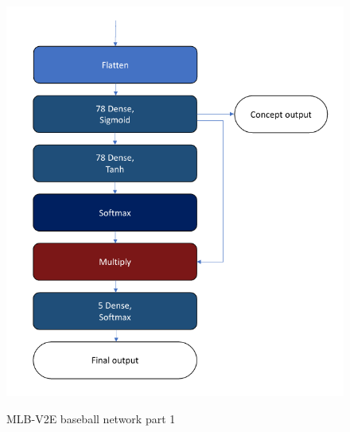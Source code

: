 \begin{figure}[h]
\caption{MLB-V2E baseball network part 1}
\vspace{10pt}
\centering
\includegraphics[width=\textwidth]{appendix/mlb network part 2.png}
\label{mlb-network-2}
\end{figure}

